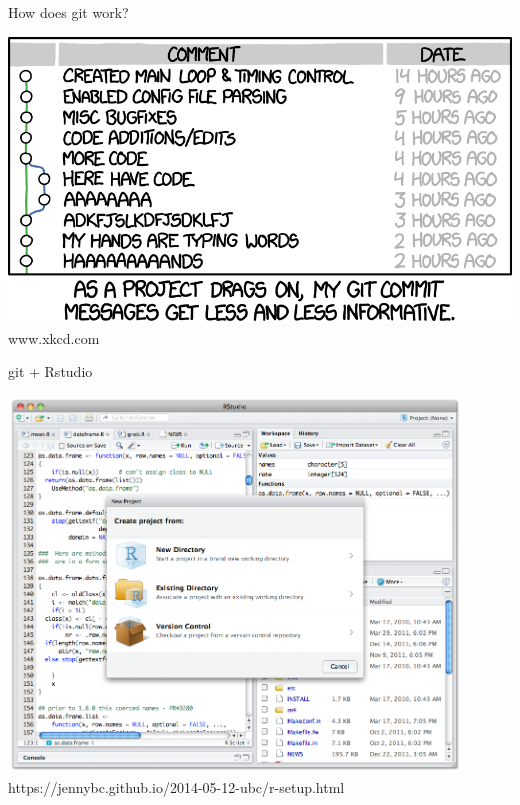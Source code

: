 \documentclass[12pt]{beamer}
\begin{document}
\begin{frame}

	\begin{flushright}
		\Large \textcolor{boss2}{How does git work?} 
	\end{flushright}

	\begin{center}
	  \includegraphics[width=\textwidth]{figs/commit.png}
		www.xkcd.com
	\end{center}

\end{frame}








\begin{frame}

	\begin{flushright}
		\Large \textcolor{boss2}{git} + \textcolor{boss4}{Rstudio} 
	\end{flushright}

	\begin{center}
	  \includegraphics[width=0.9\textwidth]{figs/rstudio.png}
		https://jennybc.github.io/2014-05-12-ubc/r-setup.html
	\end{center}

\end{frame}
\end{document}

